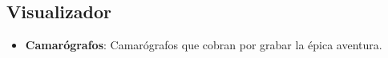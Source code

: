 \subsection{Visualizador}
\begin{itemize}
    \item \textbf{Camarógrafos}: Camarógrafos que cobran por grabar la épica
    aventura.
\end{itemize}